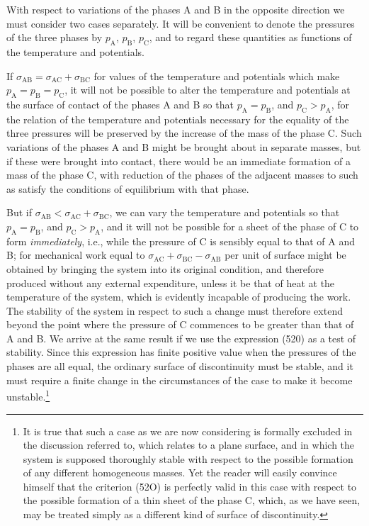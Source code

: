\documentclass[12pt]{memoir}
\begin{document}
{With respect to variations of the phases A and B in the opposite direction we must consider two cases separately. It will be convenient to denote the pressures of the three phases by $p_\text{A}$, $p_\text{B}$, $p_\text{C}$, and to regard these quantities as functions of the temperature and potentials.

If $\sigma_{\text{AB}} = \sigma_{\text{AC}} + \sigma_{\text{BC}}$ for values of the temperature and potentials which make $p_\text{A}=p_\text{B}=p_\text{C}$, it will not be possible to alter the temperature and potentials at the surface of contact of the phases A and B so that $p_\text{A}=p_\text{B}$, and $p_\text{C}>p_\text{A}$, for the relation of the temperature and potentials necessary for the equality of the three pressures will be preserved by the increase of the mass of the phase C. Such variations of the phases A and B might be brought about in separate masses, but if these were brought into contact, there would be an immediate formation of a mass of the phase C, with reduction of the phases of the adjacent masses to such as satisfy the conditions of equilibrium with that phase.

But if $\sigma_{\text{AB}} < \sigma_{\text{AC}} + \sigma_{\text{BC}}$, we can vary the temperature and potentials so that $p_\text{A}=p_\text{B}$, and $p_\text{C}>p_\text{A}$, and it will not be possible for a sheet of the phase of C to form \textit{immediately}, i.e., while the pressure of C is sensibly equal to that of A and B; for mechanical work equal to $\sigma_{\text{AC}} + \sigma_{\text{BC}} - \sigma_{\text{AB}}$ per unit of surface might be obtained by bringing the system into its original condition, and therefore produced without any external expenditure, unless it be that of heat at the temperature of the system, which is evidently incapable of producing the work. The stability of the system in respect to such a change must therefore extend beyond the point where the pressure of C commences to be greater than that of A and B. We arrive at the same result if we use the expression (520) as a test of stability. Since this expression has finite positive value when the pressures of the phases are all equal, the ordinary surface of discontinuity must be stable, and it must require a finite change in the circumstances of the case to make it become unstable.\footnote{It is true that such a case as we are now considering is formally excluded in the discussion referred to, which relates to a plane surface, and in which the system is supposed thoroughly stable with respect to the possible formation of any different homogeneous masses. Yet the reader will easily convince himself that the criterion (52O) is perfectly valid in this case with respect to the possible formation of a thin sheet of the phase C, which, as we have seen, may be treated simply as a different kind of surface of discontinuity.}

}
\end{document}
